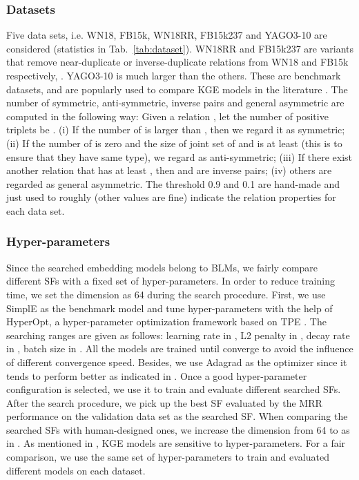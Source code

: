 \documentclass[conference]{IEEEtran}
\begin{document}
\subsubsection{Datasets}
Five data sets, i.e.  WN18, FB15k, WN18RR, FB15k237 and YAGO3-10 are considered
(statistics in Tab.~\ref{tab:dataset}).
WN18RR and FB15k237 are variants 
that remove near-duplicate or inverse-duplicate relations from WN18 and FB15k respectively,
\cite{wang2018evaluating,toutanova2015observed}.
YAGO3-10 is much larger than the others.
These are benchmark datasets,
and are popularly used to compare KGE models in the literature
\cite{bordes2013translating,yang2014embedding,trouillon2017knowledge,liu2017analogical,kazemi2018simple,lacroix2018canonical}.
The number of symmetric, anti-symmetric, inverse pairs and general asymmetric are computed in the following way:
Given a relation , let the number of positive triplets  be .
(i) If the number of  is larger than , then we regard it as symmetric;
(ii) If the number of  is zero and the size of joint set of  and  is at least 
(this is to ensure that they have same type),
we regard as anti-symmetric;
(iii) If there exist another relation  that has at least  ,
then  and  are inverse pairs;
(iv) others are regarded as general asymmetric.
The threshold 0.9 and 0.1 are hand-made and just used to roughly (other values are fine) indicate the relation properties for each data set.






\subsubsection{Hyper-parameters}
\label{ssec:hyper:setting}
Since the searched embedding models belong to BLMs,
we fairly compare different SFs with a fixed set of hyper-parameters.
In order to reduce training time,
we set the dimension  as 64 during the search procedure.
First,
we use SimplE \cite{kazemi2018simple} as the benchmark model 
and tune hyper-parameters with the help of HyperOpt,
a hyper-parameter optimization framework based on TPE \cite{bergstra2011algorithms}. 
The searching ranges are given as follows: 
learning rate  in , 
L2 penalty  in ,
decay rate in ,
batch size  in .
All the models are trained until converge
to avoid the influence of different convergence speed.
Besides, we use Adagrad \cite{duchi2011adaptive} as the optimizer
since it tends to perform better as indicated in \cite{lacroix2018canonical,trouillon2017knowledge}.
Once a good hyper-parameter configuration is selected,
we use it to train and evaluate different searched SFs.
After the search procedure, we pick up the best SF evaluated by the MRR performance 
on the validation data set
as the searched SF.
When comparing the searched SFs with human-designed ones,
we increase the dimension from 64 to  as in \cite{lacroix2018canonical}.
As mentioned in \cite{wang2018evaluating},
KGE models are sensitive to hyper-parameters.
For a fair comparison,
we use the same set of  hyper-parameters to train and evaluated different models on each dataset.
\end{document}
